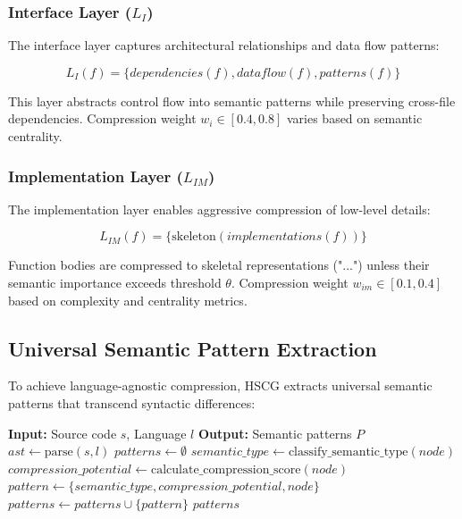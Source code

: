 \documentclass[conference]{IEEEtran}
\begin{document}
\subsubsection{Interface Layer ($L_I$)}
The interface layer captures architectural relationships and data flow patterns:

\begin{equation}
L_I(f) = \{dependencies(f), dataflow(f), patterns(f)\}
\end{equation}

This layer abstracts control flow into semantic patterns while preserving cross-file dependencies. Compression weight $w_i \in [0.4, 0.8]$ varies based on semantic centrality.

\subsubsection{Implementation Layer ($L_{IM}$)}
The implementation layer enables aggressive compression of low-level details:

\begin{equation}
L_{IM}(f) = \{\text{skeleton}(implementations(f))\}
\end{equation}

Function bodies are compressed to skeletal representations ("...") unless their semantic importance exceeds threshold $\theta$. Compression weight $w_{im} \in [0.1, 0.4]$ based on complexity and centrality metrics.

\subsection{Universal Semantic Pattern Extraction}

To achieve language-agnostic compression, HSCG extracts universal semantic patterns that transcend syntactic differences:

\begin{algorithm}
\caption{Universal Pattern Extraction}
\label{alg:pattern_extraction}
\begin{algorithmic}[1]
\STATE \textbf{Input:} Source code $s$, Language $l$
\STATE \textbf{Output:} Semantic patterns $P$
\STATE $ast \leftarrow \text{parse}(s, l)$
\STATE $patterns \leftarrow \emptyset$
        \STATE $semantic\_type \leftarrow \text{classify\_semantic\_type}(node)$
        \STATE $compression\_potential \leftarrow \text{calculate\_compression\_score}(node)$
        \STATE $pattern \leftarrow \{semantic\_type, compression\_potential, node\}$
        \STATE $patterns \leftarrow patterns \cup \{pattern\}$
    \ENDIF
\ENDFOR
\RETURN $patterns$
\end{algorithmic}
\end{algorithm}
\end{document}
